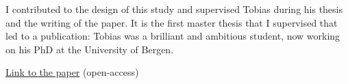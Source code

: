 I contributed to the design of this study and supervised Tobias during his thesis and the writing of the paper.
It is the first master thesis that I supervised that led to a publication: Tobias was a
brilliant and ambitious student, now working on his PhD at the University of Bergen.

\href{https://doi.org/10.5194/tc-13-469-2019}{Link to the paper} (open-access)


\iflong  \else \fi 

